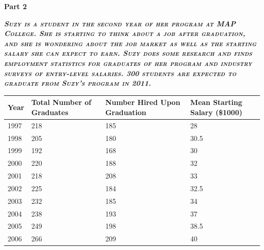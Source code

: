 \documentclass{article}
\begin{document}
\textbf{{\huge Part 2}}

\textbf{\emph{\textsc{Suzy is a student in the second year of her program at MAP College. She is starting to think about a job after graduation, and she is wondering about the job market as well as the starting salary she can expect to earn. Suzy does some research and finds employment statistics for graduates of her program and industry surveys of entry-level salaries. 300 students are expected to graduate from Suzy's program in 2011.}}}

\begin{tabular}{|m{8.5em}|m{8.5em}|m{8.5em}|m{8.5em}|}
    \hline \textbf{Year} & \textbf{Total Number of Graduates} & \textbf{Number Hired Upon Graduation} & \textbf{Mean Starting Salary (\$1000)}
    \\ \hline
    1997 & 218 & 185 & 28
    \\ \hline
    1998 & 205 & 180 & 30.5
    \\ \hline
    1999 & 192 & 168 & 30
    \\ \hline
    2000 & 220 & 188 & 32
    \\ \hline
    2001 & 218 & 208 & 33
    \\ \hline
    2002 & 225 & 184 & 32.5
    \\ \hline
    2003 & 232 & 185 & 34
    \\ \hline
    2004 & 238 & 193 & 37
    \\ \hline
    2005 & 249 & 198 & 38.5
    \\ \hline
    2006 & 266 & 209 & 40
    \\ \hline
\end{tabular}
\end{document}
